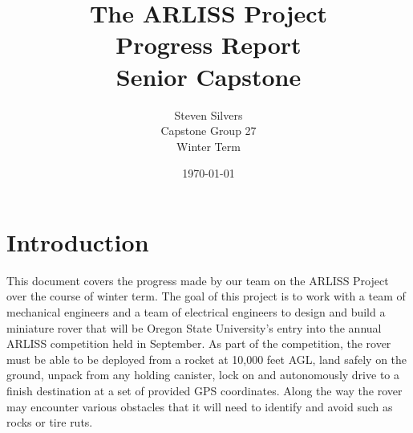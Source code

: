 \documentclass[10pt,letterpaper,onecolumn,draftclsnofoot,journal]{IEEEtran}
\begin{document}


\title{The ARLISS Project\\Progress Report\\Senior Capstone}
\author{Steven Silvers\\
	Capstone Group 27\\Winter Term}
\date{\today}
\maketitle
\vspace{1cm}
\tableofcontents
\section{Introduction}
\par
This document covers the progress made by our team on the ARLISS Project over the course of winter term. The goal of this project is to work with a team of mechanical engineers and a team of electrical engineers to design and build a miniature rover that will be Oregon State University's entry into the annual ARLISS competition held in September. As part of the competition, the rover must be able to be deployed from a rocket at 10,000 feet AGL, land safely on the ground, unpack from any holding canister, lock on and autonomously drive to a finish destination at a set of provided GPS coordinates. Along the way the rover may encounter various obstacles that it will need to identify and avoid such as rocks or tire ruts.
\end{document}
